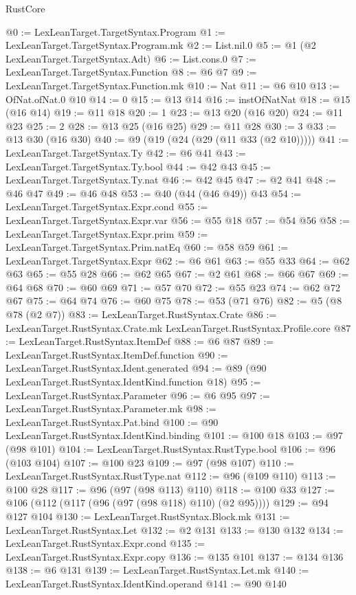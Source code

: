 \begin{lexlean}{RustCore}
\begin{coremodule}
@0 := LexLeanTarget.TargetSyntax.Program
@1 := LexLeanTarget.TargetSyntax.Program.mk
@2 := List.nil.{0}
@5 := @1 (@2 LexLeanTarget.TargetSyntax.Adt)
@6 := List.cons.{0}
@7 := LexLeanTarget.TargetSyntax.Function
@8 := @6 @7
@9 := LexLeanTarget.TargetSyntax.Function.mk
@10 := Nat
@11 := @6 @10
@13 := OfNat.ofNat.{0} @10
@14 := 0
@15 := @13 @14
@16 := instOfNatNat
@18 := @15 (@16 @14)
@19 := @11 @18
@20 := 1
@23 := @13 @20 (@16 @20)
@24 := @11 @23
@25 := 2
@28 := @13 @25 (@16 @25)
@29 := @11 @28
@30 := 3
@33 := @13 @30 (@16 @30)
@40 := @9 (@19 (@24 (@29 (@11 @33 (@2 @10)))))
@41 := LexLeanTarget.TargetSyntax.Ty
@42 := @6 @41
@43 := LexLeanTarget.TargetSyntax.Ty.bool
@44 := @42 @43
@45 := LexLeanTarget.TargetSyntax.Ty.nat
@46 := @42 @45
@47 := @2 @41
@48 := @46 @47
@49 := @46 @48
@53 := @40 (@44 (@46 @49)) @43
@54 := LexLeanTarget.TargetSyntax.Expr.cond
@55 := LexLeanTarget.TargetSyntax.Expr.var
@56 := @55 @18
@57 := @54 @56
@58 := LexLeanTarget.TargetSyntax.Expr.prim
@59 := LexLeanTarget.TargetSyntax.Prim.natEq
@60 := @58 @59
@61 := LexLeanTarget.TargetSyntax.Expr
@62 := @6 @61
@63 := @55 @33
@64 := @62 @63
@65 := @55 @28
@66 := @62 @65
@67 := @2 @61
@68 := @66 @67
@69 := @64 @68
@70 := @60 @69
@71 := @57 @70
@72 := @55 @23
@74 := @62 @72 @67
@75 := @64 @74
@76 := @60 @75
@78 := @53 (@71 @76)
@82 := @5 (@8 @78 (@2 @7))
@83 := LexLeanTarget.RustSyntax.Crate
@86 := LexLeanTarget.RustSyntax.Crate.mk LexLeanTarget.RustSyntax.Profile.core
@87 := LexLeanTarget.RustSyntax.ItemDef
@88 := @6 @87
@89 := LexLeanTarget.RustSyntax.ItemDef.function
@90 := LexLeanTarget.RustSyntax.Ident.generated
@94 := @89 (@90 LexLeanTarget.RustSyntax.IdentKind.function @18)
@95 := LexLeanTarget.RustSyntax.Parameter
@96 := @6 @95
@97 := LexLeanTarget.RustSyntax.Parameter.mk
@98 := LexLeanTarget.RustSyntax.Pat.bind
@100 := @90 LexLeanTarget.RustSyntax.IdentKind.binding
@101 := @100 @18
@103 := @97 (@98 @101)
@104 := LexLeanTarget.RustSyntax.RustType.bool
@106 := @96 (@103 @104)
@107 := @100 @23
@109 := @97 (@98 @107)
@110 := LexLeanTarget.RustSyntax.RustType.nat
@112 := @96 (@109 @110)
@113 := @100 @28
@117 := @96 (@97 (@98 @113) @110)
@118 := @100 @33
@127 := @106 (@112 (@117 (@96 (@97 (@98 @118) @110) (@2 @95))))
@129 := @94 @127 @104
@130 := LexLeanTarget.RustSyntax.Block.mk
@131 := LexLeanTarget.RustSyntax.Let
@132 := @2 @131
@133 := @130 @132
@134 := LexLeanTarget.RustSyntax.Expr.cond
@135 := LexLeanTarget.RustSyntax.Expr.copy
@136 := @135 @101
@137 := @134 @136
@138 := @6 @131
@139 := LexLeanTarget.RustSyntax.Let.mk
@140 := LexLeanTarget.RustSyntax.IdentKind.operand
@141 := @90 @140

\end{coremodule}
\end{lexlean}
